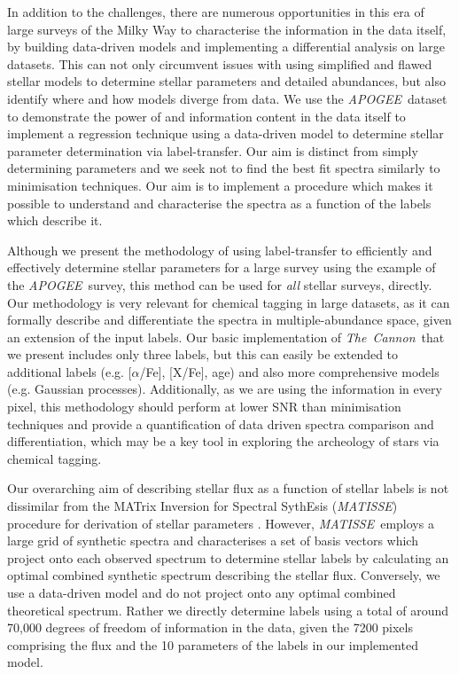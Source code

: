 \documentclass[12pt, preprint]{aastex}
\newcommand{\tc}{\textsl{The~Cannon}}
\newcommand{\apogee}{\textsl{APOGEE}}
\newcommand{\matisse}{\textsl{MATISSE}}
\begin{document}
In addition to the challenges, there are numerous opportunities in this era of large surveys of the Milky Way to characterise the information in the data itself, by building data-driven models and implementing a differential analysis on large datasets. This can not only circumvent issues with using simplified and flawed stellar models to determine stellar parameters and detailed abundances, but also identify where and how models diverge from data. We use the \apogee\ dataset to demonstrate the power of and information content in the data itself to implement a regression technique using a data-driven model to determine stellar parameter determination via label-transfer. Our aim is distinct from simply determining parameters and we seek not to find the best fit spectra similarly to minimisation techniques. Our aim is to implement a procedure which makes it possible to understand and characterise the spectra as a function of the labels which describe it. 

Although we present the methodology of using label-transfer to efficiently and effectively determine stellar parameters for a large survey using the example of the \apogee\ survey, this method can be used for \textit{all} stellar surveys, directly.  Our methodology is very relevant for chemical tagging in large datasets, as it can formally describe and differentiate the spectra in multiple-abundance space, given an extension of the input labels.  Our basic implementation of \tc\ that we present includes only three labels, but this can easily be extended to additional labels  (e.g. [$\alpha$/Fe], [X/Fe], age) and also more comprehensive models (e.g. Gaussian processes). Additionally, as we are using the information in every pixel, this methodology should perform at lower SNR than minimisation techniques and provide a quantification of data driven spectra comparison and differentiation, which may be a key tool in exploring the archeology of stars via chemical tagging. 

Our overarching aim of describing stellar flux as a function of stellar labels is not dissimilar from the MATrix Inversion for Spectral SythEsis (\matisse) procedure for derivation of stellar parameters \citep{RB2006}. However, \matisse\ employs a large grid of synthetic spectra and characterises a set of basis vectors which project onto each observed spectrum to determine stellar labels by calculating an optimal combined synthetic spectrum describing the stellar flux. Conversely, we use a data-driven model and do not project onto any optimal combined theoretical spectrum. Rather we directly determine labels using a total of around 70,000 degrees of freedom of information in the data, given the 7200 pixels comprising the flux and the 10 parameters of the labels in our implemented model. 
\end{document}
